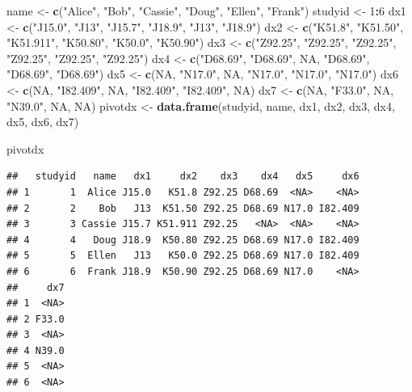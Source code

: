 \documentclass[
]{book}
\newenvironment{Shaded}{\begin{snugshade}}{\end{snugshade}}
\newcommand{\DecValTok}[1]{\textcolor[rgb]{0.00,0.00,0.81}{#1}}
\newcommand{\KeywordTok}[1]{\textcolor[rgb]{0.13,0.29,0.53}{\textbf{#1}}}
\newcommand{\NormalTok}[1]{#1}
\newcommand{\OperatorTok}[1]{\textcolor[rgb]{0.81,0.36,0.00}{\textbf{#1}}}
\newcommand{\OtherTok}[1]{\textcolor[rgb]{0.56,0.35,0.01}{#1}}
\newcommand{\StringTok}[1]{\textcolor[rgb]{0.31,0.60,0.02}{#1}}
\begin{document}
\begin{Shaded}
\begin{Highlighting}[]
\NormalTok{name <-}\StringTok{ }\KeywordTok{c}\NormalTok{(}\StringTok{"Alice"}\NormalTok{, }\StringTok{"Bob"}\NormalTok{, }\StringTok{"Cassie"}\NormalTok{, }\StringTok{"Doug"}\NormalTok{, }\StringTok{"Ellen"}\NormalTok{, }\StringTok{"Frank"}\NormalTok{)}
\NormalTok{studyid <-}\StringTok{ }\DecValTok{1}\OperatorTok{:}\DecValTok{6}
\NormalTok{dx1 <-}\StringTok{ }\KeywordTok{c}\NormalTok{(}\StringTok{"J15.0"}\NormalTok{, }\StringTok{"J13"}\NormalTok{, }\StringTok{"J15.7"}\NormalTok{, }\StringTok{"J18.9"}\NormalTok{, }\StringTok{"J13"}\NormalTok{, }\StringTok{"J18.9"}\NormalTok{)}
\NormalTok{dx2 <-}\StringTok{ }\KeywordTok{c}\NormalTok{(}\StringTok{"K51.8"}\NormalTok{, }\StringTok{"K51.50"}\NormalTok{, }\StringTok{"K51.911"}\NormalTok{, }\StringTok{"K50.80"}\NormalTok{, }\StringTok{"K50.0"}\NormalTok{, }\StringTok{"K50.90"}\NormalTok{)}
\NormalTok{dx3 <-}\StringTok{ }\KeywordTok{c}\NormalTok{(}\StringTok{"Z92.25"}\NormalTok{, }\StringTok{"Z92.25"}\NormalTok{, }\StringTok{"Z92.25"}\NormalTok{, }\StringTok{"Z92.25"}\NormalTok{, }\StringTok{"Z92.25"}\NormalTok{, }\StringTok{"Z92.25"}\NormalTok{)}
\NormalTok{dx4 <-}\StringTok{ }\KeywordTok{c}\NormalTok{(}\StringTok{"D68.69"}\NormalTok{, }\StringTok{"D68.69"}\NormalTok{, }\OtherTok{NA}\NormalTok{, }\StringTok{"D68.69"}\NormalTok{, }\StringTok{"D68.69"}\NormalTok{, }\StringTok{"D68.69"}\NormalTok{)}
\NormalTok{dx5 <-}\StringTok{ }\KeywordTok{c}\NormalTok{(}\OtherTok{NA}\NormalTok{, }\StringTok{"N17.0"}\NormalTok{, }\OtherTok{NA}\NormalTok{, }\StringTok{"N17.0"}\NormalTok{, }\StringTok{"N17.0"}\NormalTok{, }\StringTok{"N17.0"}\NormalTok{)}
\NormalTok{dx6 <-}\StringTok{ }\KeywordTok{c}\NormalTok{(}\OtherTok{NA}\NormalTok{, }\StringTok{"I82.409"}\NormalTok{, }\OtherTok{NA}\NormalTok{, }\StringTok{"I82.409"}\NormalTok{, }\StringTok{"I82.409"}\NormalTok{, }\OtherTok{NA}\NormalTok{)}
\NormalTok{dx7 <-}\StringTok{ }\KeywordTok{c}\NormalTok{(}\OtherTok{NA}\NormalTok{, }\StringTok{"F33.0"}\NormalTok{, }\OtherTok{NA}\NormalTok{, }\StringTok{"N39.0"}\NormalTok{, }\OtherTok{NA}\NormalTok{, }\OtherTok{NA}\NormalTok{)}
\NormalTok{pivotdx <-}\StringTok{ }\KeywordTok{data.frame}\NormalTok{(studyid, name, dx1, dx2, dx3, dx4, dx5, dx6, dx7)}

\NormalTok{pivotdx}
\end{Highlighting}
\end{Shaded}

\begin{verbatim}
##   studyid   name   dx1     dx2    dx3    dx4   dx5     dx6
## 1       1  Alice J15.0   K51.8 Z92.25 D68.69  <NA>    <NA>
## 2       2    Bob   J13  K51.50 Z92.25 D68.69 N17.0 I82.409
## 3       3 Cassie J15.7 K51.911 Z92.25   <NA>  <NA>    <NA>
## 4       4   Doug J18.9  K50.80 Z92.25 D68.69 N17.0 I82.409
## 5       5  Ellen   J13   K50.0 Z92.25 D68.69 N17.0 I82.409
## 6       6  Frank J18.9  K50.90 Z92.25 D68.69 N17.0    <NA>
##     dx7
## 1  <NA>
## 2 F33.0
## 3  <NA>
## 4 N39.0
## 5  <NA>
## 6  <NA>
\end{verbatim}
\end{document}
